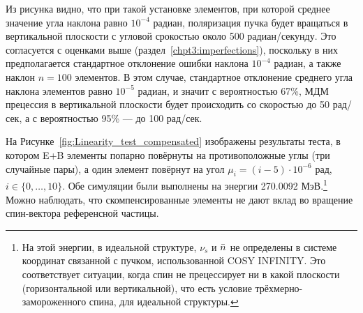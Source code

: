 Из рисунка видно, что при такой установке элементов, при которой среднее значение угла наклона равно $10^{-4}$ радиан, поляризация пучка будет вращаться в вертикальной плоскости с угловой срокостью около 500 радиан/секунду. Это согласуется с оценками выше (раздел~\ref{chpt3:imperfections}), поскольку в них предполагается стандартное отклонение ошибки наклона $10^{-4}$ радиан, а также наклон $n=100$ элементов. В этом случае, стандартное отклонение среднего угла наклона элементов равно $10^{-5}$ радиан, и значит с вероятностью 67\%, МДМ прецессия в вертикальной плоскости будет происходить со скоростью до 50 рад/сек, а с вероятностью 95\% --- до 100 рад/сек.

На Рисунке~\ref{fig:Linearity_test_compensated} изображены результаты теста, в котором E+B элементы попарно повёрнуты на противоположные углы (три случайные пары), а один элемент повёрнут на угол
$\mu_i = (i-5)\cdot 10^{-6}$ рад, $i\in\lbrace0,\dots,10\rbrace$. Обе симуляции были выполнены на энергии
270.0092 МэВ.\footnote{На этой энергии, в идеальной структуре, $\nu_s$ и $\bar n$
	не определены в системе координат связанной с пучком, использованной
	COSY INFINITY. Это соответствует ситуации, когда спин не прецессирует ни в какой плоскости 
	(горизонтальной или вертикальной), что есть условие трёхмерно-замороженного спина, 
	для идеальной структуры.} Можно наблюдать, что скомпенсированные элементы не дают вклад во вращение
спин-вектора референсной частицы.

